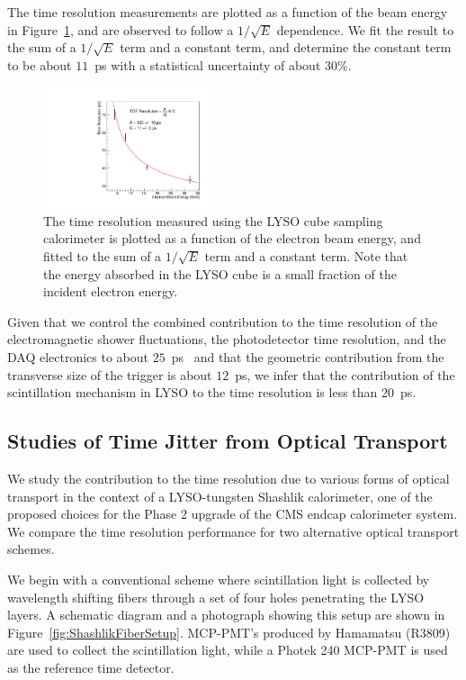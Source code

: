 \documentclass[12pt]{article}
\begin{document}
The time resolution measurements are plotted as a function of the
beam energy in Figure~\ref{fig:LYSOCubeTOFResolutionVsEnergy}, and are observed
to follow a $1/\sqrt{E}$ dependence. We fit the result to the sum of a 
$1/\sqrt{E}$ term and a constant term, and determine the constant term to
be about $11$~ps with a statistical uncertainty of about $30\%$. 

\begin{figure}[h] \centering
\includegraphics[width=0.45\textwidth]{figs/TimeResolutionVsEnergy_CrystalCube} 
\caption{ The time resolution measured using the LYSO cube
sampling calorimeter is plotted as a function of the electron beam energy, 
and fitted to the sum of a $1/\sqrt{E}$ term and a constant term. Note that the energy absorbed in the LYSO cube is a small fraction of the incident electron energy.}
\label{fig:LYSOCubeTOFResolutionVsEnergy}
\end{figure}

Given that we control the combined contribution to the time 
resolution of the electromagnetic shower
fluctuations, the photodetector time resolution, and the DAQ electronics
to about $25$~ps~\cite{MCPFastCaloNIMA} and that the geometric contribution 
from the transverse size of the trigger is about $12$~ps,
we infer that the contribution of the scintillation mechanism in LYSO
to the time resolution is less than $20$~ps.


\subsection{Studies of Time Jitter from Optical Transport}

We study the contribution to the time resolution due to
various forms of optical transport in the context of a LYSO-tungsten Shashlik
calorimeter, one of the proposed choices for the Phase 2 upgrade of the
CMS endcap calorimeter system. We compare the time  resolution
performance for two alternative optical transport schemes. 

We begin with a conventional scheme where scintillation light is collected
by wavelength shifting fibers through a set of four holes penetrating 
the LYSO layers. A schematic diagram and a photograph showing this setup 
are shown in Figure~\ref{fig:ShashlikFiberSetup}. 
MCP-PMT's produced by Hamamatsu (R3809) are used to collect 
the scintillation light, while a Photek 240 MCP-PMT is used as the reference 
time detector. 
\end{document}
